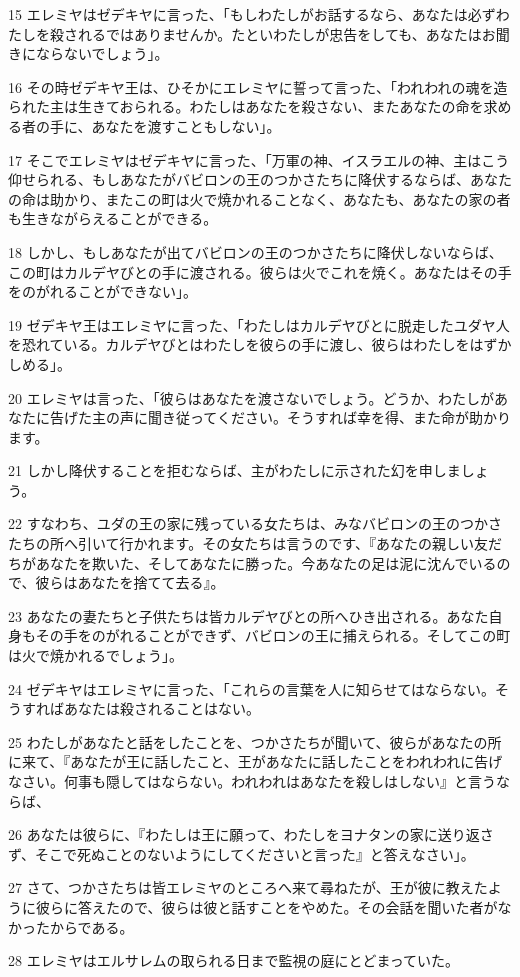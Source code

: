 \par 15 エレミヤはゼデキヤに言った、「もしわたしがお話するなら、あなたは必ずわたしを殺されるではありませんか。たといわたしが忠告をしても、あなたはお聞きにならないでしょう」。
\par 16 その時ゼデキヤ王は、ひそかにエレミヤに誓って言った、「われわれの魂を造られた主は生きておられる。わたしはあなたを殺さない、またあなたの命を求める者の手に、あなたを渡すこともしない」。
\par 17 そこでエレミヤはゼデキヤに言った、「万軍の神、イスラエルの神、主はこう仰せられる、もしあなたがバビロンの王のつかさたちに降伏するならば、あなたの命は助かり、またこの町は火で焼かれることなく、あなたも、あなたの家の者も生きながらえることができる。
\par 18 しかし、もしあなたが出てバビロンの王のつかさたちに降伏しないならば、この町はカルデヤびとの手に渡される。彼らは火でこれを焼く。あなたはその手をのがれることができない」。
\par 19 ゼデキヤ王はエレミヤに言った、「わたしはカルデヤびとに脱走したユダヤ人を恐れている。カルデヤびとはわたしを彼らの手に渡し、彼らはわたしをはずかしめる」。
\par 20 エレミヤは言った、「彼らはあなたを渡さないでしょう。どうか、わたしがあなたに告げた主の声に聞き従ってください。そうすれば幸を得、また命が助かります。
\par 21 しかし降伏することを拒むならば、主がわたしに示された幻を申しましょう。
\par 22 すなわち、ユダの王の家に残っている女たちは、みなバビロンの王のつかさたちの所へ引いて行かれます。その女たちは言うのです、『あなたの親しい友だちがあなたを欺いた、そしてあなたに勝った。今あなたの足は泥に沈んでいるので、彼らはあなたを捨てて去る』。
\par 23 あなたの妻たちと子供たちは皆カルデヤびとの所へひき出される。あなた自身もその手をのがれることができず、バビロンの王に捕えられる。そしてこの町は火で焼かれるでしょう」。
\par 24 ゼデキヤはエレミヤに言った、「これらの言葉を人に知らせてはならない。そうすればあなたは殺されることはない。
\par 25 わたしがあなたと話をしたことを、つかさたちが聞いて、彼らがあなたの所に来て、『あなたが王に話したこと、王があなたに話したことをわれわれに告げなさい。何事も隠してはならない。われわれはあなたを殺しはしない』と言うならば、
\par 26 あなたは彼らに、『わたしは王に願って、わたしをヨナタンの家に送り返さず、そこで死ぬことのないようにしてくださいと言った』と答えなさい」。
\par 27 さて、つかさたちは皆エレミヤのところへ来て尋ねたが、王が彼に教えたように彼らに答えたので、彼らは彼と話すことをやめた。その会話を聞いた者がなかったからである。
\par 28 エレミヤはエルサレムの取られる日まで監視の庭にとどまっていた。

